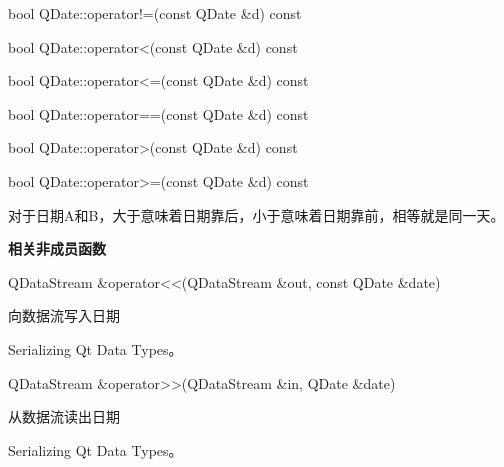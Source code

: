 bool QDate::operator!=(const QDate \&d) const

bool QDate::operator<(const QDate \&d) const

bool QDate::operator<=(const QDate \&d) const

bool QDate::operator==(const QDate \&d) const

bool QDate::operator>(const QDate \&d) const

bool QDate::operator>=(const QDate \&d) const

对于日期A和B，大于意味着日期靠后，小于意味着日期靠前，相等就是同一天。

\splitLine


\textbf{相关非成员函数}

QDataStream \&operator<<(QDataStream \&out, const QDate \&date)

向数据流写入日期


\begin{notice}[另请参阅]
Serializing Qt Data Types。
\end{notice}

QDataStream \&operator>>(QDataStream \&in, QDate \&date)

从数据流读出日期

\begin{notice}[另请参阅]
Serializing Qt Data Types。
\end{notice}